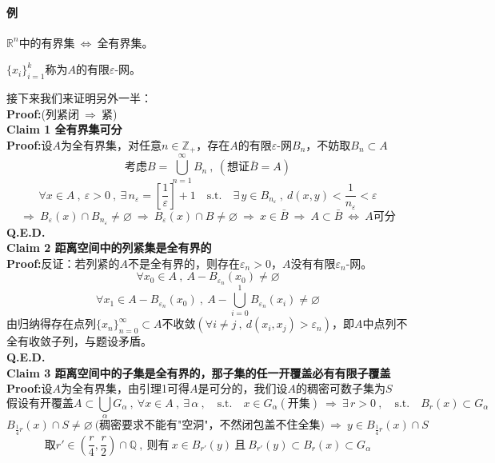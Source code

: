 \paragraph*{例} \quad $\mathbb{R}^n$中的有界集$\ \Leftrightarrow \ $全有界集。
\begin{definition}[有限$\varepsilon$-网]
    $\{x_i\}_{i=1}^k$称为$A$的有限$\varepsilon$-网。
\end{definition}
接下来我们来证明另外一半：\\
\textbf{Proof:}(列紧闭$ \ \Rightarrow \ $紧)\\
\textbf{Claim 1 全有界集可分}\\
\textbf{Proof:}设$A$为全有界集，对任意$n \in \mathbb{Z}_+$，存在$A$的有限$\varepsilon$-网$B_n$，不妨取$B_n \subset A$
\[\text{考虑}B=\bigcup_{n=1}^{\infty}B_n \ , \ (\text{想证}\bar{B}=A)\]
\[\forall x \in A \ , \ \varepsilon>0 \ , \ \exists \, n_{\varepsilon}=\left[\frac{1}{\varepsilon}\right]+1 \quad \text{s.t.} \quad \exists \, y \in B_{n_{\varepsilon}} \ , \ d(x,y)<\frac{1}{n_{\varepsilon}}<\varepsilon\]
\[\Rightarrow \ B_{\varepsilon}(x) \cap B_{n_{\varepsilon}} \neq \varnothing \ \Rightarrow \ B_{\varepsilon}(x) \cap B \neq \varnothing \ \Rightarrow \ x \in \bar{B} \ \Rightarrow \ A \subset \bar{B} \ \Leftrightarrow \ A\text{可分}\]
\textbf{Q.E.D.}\\
\textbf{Claim 2 距离空间中的列紧集是全有界的}\\
\textbf{Proof:}反证：若列紧的$A$不是全有界的，则存在$\varepsilon_n>0$，$A$没有有限$\varepsilon_n$-网。
\[\forall x_0 \in A \ , \ A-B_{\varepsilon_n}(x_0) \neq \varnothing\]
\[\forall x_1 \in A-B_{\varepsilon_n}(x_0) \ , \ A-\bigcup_{i=0}^1B_{\varepsilon_n}(x_i) \neq \varnothing\]
由归纳得存在点列$\{x_n\}_{n=0}^{\infty} \subset A$不收敛$(\forall i \neq j \ , \ d(x_i,x_j)>\varepsilon_n)$，即$A$中点列不全有收敛子列，与题设矛盾。\\
\textbf{Q.E.D.}\\
\textbf{Claim 3 距离空间中的子集是全有界的，那子集的任一开覆盖必有有限子覆盖}\\
\textbf{Proof:}设$A$为全有界集，由引理1可得$A$是可分的，我们设$A$的稠密可数子集为$S$
\[\text{假设有开覆盖}A \subset \bigcup_{\alpha}G_{\alpha} \ , \ \forall x \in A \ , \ \exists \, \alpha \ , \quad \text{s.t.} \quad x \in G_{\alpha}(\text{开集}) \ \Rightarrow \ \exists \,r>0 \ , \quad \text{s.t.} \quad B_r(x) \subset G_{\alpha}\]
\[B_{\frac{1}{4}r}(x) \cap S \neq \varnothing \ \text{(稠密要求不能有"空洞"，不然闭包盖不住全集)} \ \Rightarrow \ y \in B_{\frac{1}{4}r}(x) \cap S\]
\[\text{取}r' \in \left(\frac{r}{4},\frac{r}{2}\right) \cap \mathbb{Q} \ , \ \text{则有} \ x \in B_{r'}(y) \ \text{且} \ B_{r'}(y) \subset B_{r}(x) \subset G_{\alpha}\]
